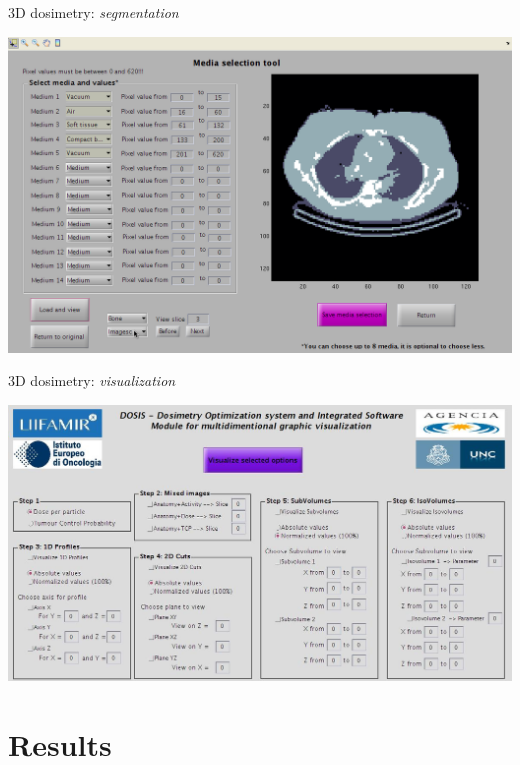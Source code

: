 \documentclass[ignorenonframetext,]{beamer}
\begin{document}
\begin{frame}{3D dosimetry: \emph{segmentation}}
\protect\hypertarget{d-dosimetry-segmentation}{}

\includegraphics{imgs/3d-segmentation.png}

\end{frame}

\begin{frame}{3D dosimetry: \emph{visualization}}
\protect\hypertarget{d-dosimetry-visualization}{}

\includegraphics{imgs/3d-viz.jpg}

\end{frame}

\hypertarget{results}{%
\section{Results}\label{results}}
\end{document}
